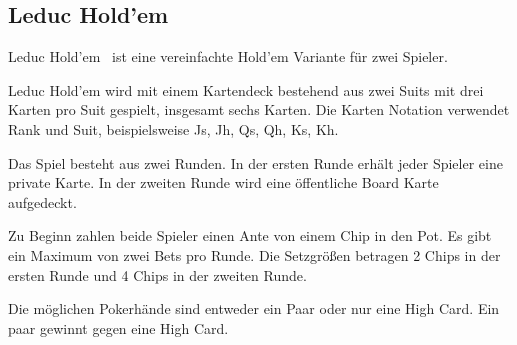 \subsection{Leduc Hold'em}
Leduc Hold'em~\cite{southey2005bayes} ist eine vereinfachte Hold'em Variante für zwei Spieler.

Leduc Hold'em wird mit einem Kartendeck bestehend aus zwei Suits mit drei Karten pro Suit gespielt, insgesamt sechs Karten.
Die Karten Notation verwendet Rank und Suit, beispielsweise Js, Jh, Qs, Qh, Ks, Kh.

Das Spiel besteht aus zwei Runden.
In der ersten Runde erhält jeder Spieler eine private Karte.
In der zweiten Runde wird eine öffentliche Board Karte aufgedeckt.

Zu Beginn zahlen beide Spieler einen Ante von einem Chip in den Pot.
Es gibt ein Maximum von zwei Bets pro Runde.
Die Setzgrößen betragen 2 Chips in der ersten Runde und 4 Chips in der zweiten Runde.

Die möglichen Pokerhände sind entweder ein Paar oder nur eine High Card. 
Ein paar gewinnt gegen eine High Card.

